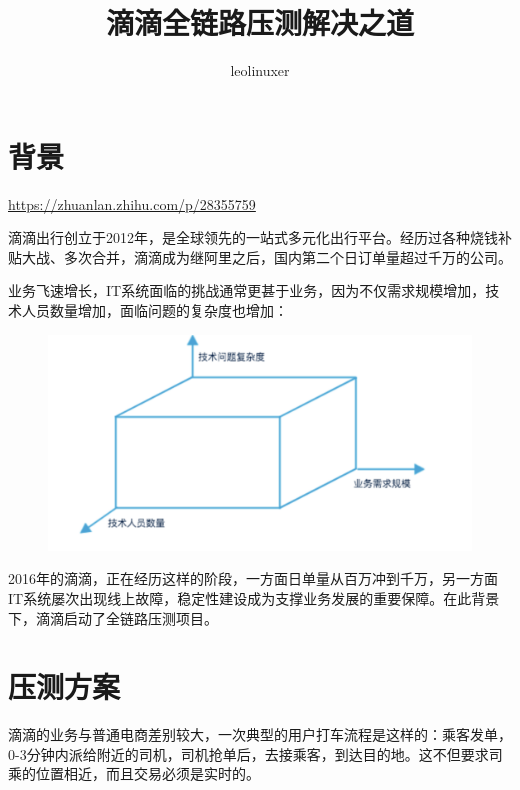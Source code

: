 \documentclass[12pt]{article}
\title{滴滴全链路压测解决之道}
\author{leolinuxer}
\begin{document}
\maketitle
\tableofcontents

\section{背景}
\url{https://zhuanlan.zhihu.com/p/28355759}

滴滴出行创立于2012年，是全球领先的一站式多元化出行平台。经历过各种烧钱补贴大战、多次合并，滴滴成为继阿里之后，国内第二个日订单量超过千万的公司。

业务飞速增长，IT系统面临的挑战通常更甚于业务，因为不仅需求规模增加，技术人员数量增加，面临问题的复杂度也增加：

\begin{figure}[H]
    \centering
    \includegraphics[width=.6\textwidth]{fig/DIDI_Pressure_1.png}
\end{figure}

2016年的滴滴，正在经历这样的阶段，一方面日单量从百万冲到千万，另一方面IT系统屡次出现线上故障，稳定性建设成为支撑业务发展的重要保障。在此背景下，滴滴启动了全链路压测项目。

\section{压测方案}
滴滴的业务与普通电商差别较大，一次典型的用户打车流程是这样的：乘客发单，0-3分钟内派给附近的司机，司机抢单后，去接乘客，到达目的地。这不但要求司乘的位置相近，而且交易必须是实时的。
\end{document}
